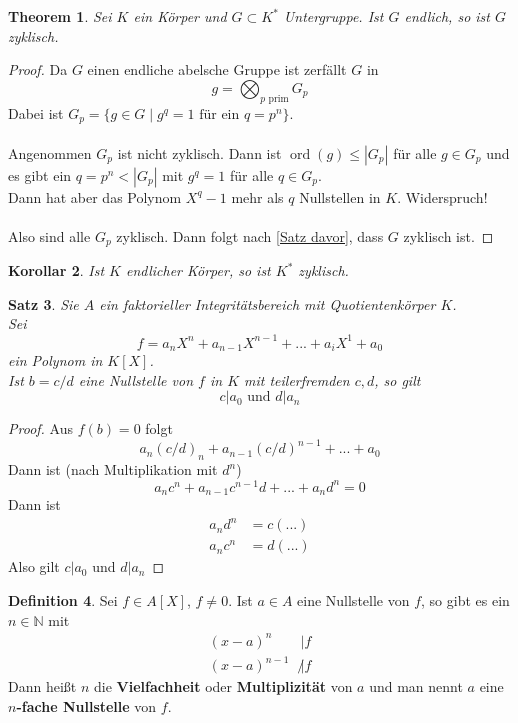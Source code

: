 \documentclass[10pt,a4paper]{article}
\newcommand{\N}{\ensuremath{\mathbb{N}}}
\newcommand{\ord}{\operatorname{ord}}
\theoremstyle{plain}
\newtheorem{theorem}{Theorem}[section]
\newtheorem{kor}[theorem]{Korollar}
\newtheorem{satz}[theorem]{Satz}
\theoremstyle{definition}
\newtheorem{definition}[theorem]{Definition}
\theoremstyle{remark}
\begin{document}
	\begin{theorem}
		Sei $K$ ein Körper und $G\subset K^*$ Untergruppe. Ist $G$ endlich, so ist $G$ zyklisch.
	\end{theorem}
	\begin{proof}
		Da $G$ einen endliche abelsche Gruppe ist zerfällt $G$ in
		\[g=\bigotimes_{\text{$p$ prim}}G_p\]
		Dabei ist $G_p=\{g\in G\mid \text{$g^q=1$ für ein $q=p^n$}\}$.\\
		\\
		Angenommen $G_p$ ist nicht zyklisch. Dann ist $\ord(g)\leq |G_p|$ für alle $g\in G_p$ und es gibt ein $q=p^n<|G_p|$ mit $g^q=1$ für alle $q\in G_p$.\\
		Dann hat aber das Polynom $X^q-1$ mehr als $q$ Nullstellen in $K$. Widerspruch!\\
		\\
		Also sind alle $G_p$ zyklisch. Dann folgt nach \ref{Satz davor}, dass $G$ zyklisch ist.
	\end{proof}

	\begin{kor}
		Ist $K$ endlicher Körper, so ist $K^*$ zyklisch.
	\end{kor}

	\begin{satz}
		Sie $A$ ein faktorieller Integritätsbereich mit Quotientenkörper $K$.\\
		Sei
		\[f=a_nX^n+a_{n-1}X^{n-1}+...+a_iX^1+a_0\]
		ein Polynom in $K[X]$.\\
		Ist $b=c/d$ eine Nullstelle von $f$ in $K$ mit teilerfremden $c,d$, so gilt
		\[\text{$c|a_0$ und $d|a_n$}\]
	\end{satz}
	\begin{proof}
		Aus $f(b)=0$ folgt\[a_n\left(c/d\right)_{n}+a_{n-1}(c/d)^{n-1}+...+a_0\]
		Dann ist (nach Multiplikation mit $d^n$)
		\[a_nc^n+a_{n-1}c^{n-1}d+...+a_nd^n=0\]
		Dann ist
		\begin{align*}
		a_nd^n&=c(...)\\
		a_nc^n&=d(...)
		\end{align*}
		Also gilt $c|a_0$ und $d|a_n$
	\end{proof}

	\begin{definition}
		Sei $f\in A[X]$, $f\neq 0$. Ist $a\in A$ eine Nullstelle von $f$, so gibt es ein $n\in\N$ mit
		\begin{align*}
		(x-a)^n&|f\\
		(x-a)^{n-1}&\not |f
		\end{align*} 
		Dann heißt $n$ die \textbf{Vielfachheit} oder \textbf{Multiplizität} von $a$ und man nennt $a$ eine \textbf{$n$-fache Nullstelle} von $f$.
	\end{definition}
\end{document}
